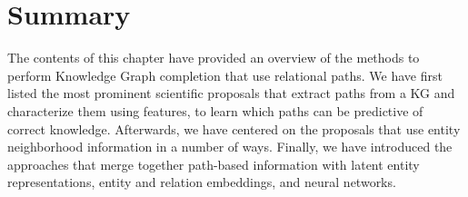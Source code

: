 \section{Summary}\label{sec:path-summary}
The contents of this chapter have provided an overview of the methods to perform Knowledge Graph completion that use relational paths. We have first listed the most prominent scientific proposals that extract paths from a KG and characterize them using features, to learn which paths can be predictive of correct knowledge. Afterwards, we have centered on the proposals that use entity neighborhood information in a number of ways. Finally, we have introduced the approaches that merge together path-based information with latent entity representations, entity and relation embeddings, and neural networks.